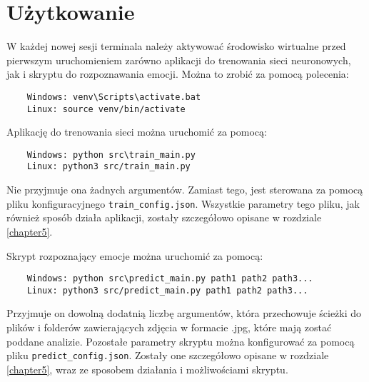 \section{Użytkowanie}
W każdej nowej sesji terminala należy aktywować środowisko wirtualne przed pierwszym uruchomieniem zarówno aplikacji do trenowania sieci neuronowych, jak i skryptu do rozpoznawania emocji. Można to zrobić za pomocą polecenia:
\begin{verbatim}
    Windows: venv\Scripts\activate.bat
    Linux: source venv/bin/activate
\end{verbatim}

Aplikację do trenowania sieci można uruchomić za pomocą:
\begin{verbatim}
    Windows: python src\train_main.py
    Linux: python3 src/train_main.py
\end{verbatim}
Nie przyjmuje ona żadnych argumentów. Zamiast tego, jest sterowana za pomocą pliku konfiguracyjnego \verb|train_config.json|. Wszystkie parametry tego pliku, jak również sposób działa aplikacji, zostały szczegółowo opisane w rozdziale \ref{chapter5}.

Skrypt rozpoznający emocje można uruchomić za pomocą:
\begin{verbatim}
    Windows: python src\predict_main.py path1 path2 path3...
    Linux: python3 src/predict_main.py path1 path2 path3...
\end{verbatim}
Przyjmuje on dowolną dodatnią liczbę argumentów, która przechowuje ścieżki do plików i folderów zawierających zdjęcia w formacie .jpg, które mają zostać poddane analizie. Pozostałe parametry skryptu można konfigurować za pomocą pliku \verb|predict_config.json|. Zostały one szczegółowo opisane w rozdziale \ref{chapter5}, wraz ze sposobem działania i możliwościami skryptu.
